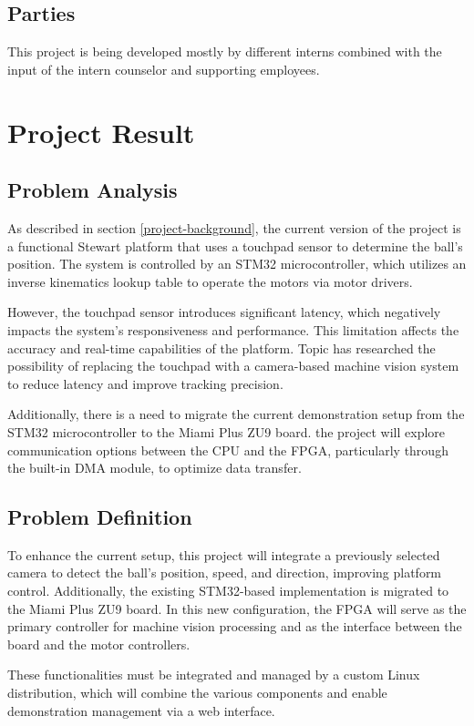 \documentclass{article}
\begin{document}
\subsection{Parties}
This project is being developed mostly by different interns combined with the input of the intern counselor and supporting employees.


\newpage
\section{Project Result}


\subsection{Problem Analysis} As described in section \ref{project-background},
the current version of the project is a functional Stewart platform that uses a
touchpad sensor to determine the ball's position. The system is controlled by an
STM32 microcontroller, which utilizes an inverse kinematics lookup table to
operate the motors via motor drivers.

However, the touchpad sensor introduces significant latency, which negatively
impacts the system’s responsiveness and performance. This limitation affects the
accuracy and real-time capabilities of the platform. Topic has researched the
possibility of replacing the touchpad with a camera-based machine vision system
to reduce latency and improve tracking precision.

Additionally, there is a need to migrate the current demonstration setup from
the STM32 microcontroller to the Miami Plus ZU9 board.
the project will explore communication options between the CPU and the FPGA,
particularly through the built-in DMA module, to optimize data transfer.

\subsection{Problem Definition} To enhance the current setup, this project will
integrate a previously selected camera to detect the ball's position, speed, and
direction, improving platform control. Additionally, the existing STM32-based
implementation is migrated to the Miami Plus ZU9 board. In this new
configuration, the FPGA will serve as the primary controller for machine vision
processing and as the interface between the board and the motor controllers.

These functionalities must be integrated and managed by a custom
Linux distribution, which will combine the various components and enable
demonstration management via a web interface.
\end{document}
